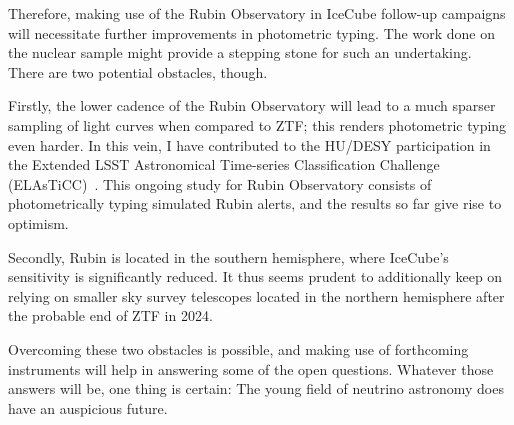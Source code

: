 Therefore, making use of the Rubin Observatory in IceCube follow-up campaigns will necessitate further improvements in photometric typing. The work done on the nuclear sample might provide a stepping stone for such an undertaking. There are two potential obstacles, though.

Firstly, the lower cadence of the Rubin Observatory will lead to a much sparser sampling of light curves when compared to ZTF; this renders photometric typing even harder. In this vein, I have contributed to the HU/DESY participation in the Extended LSST Astronomical Time-series Classification Challenge (ELAsTiCC)~. This ongoing study for Rubin Observatory consists of photometrically typing simulated Rubin alerts, and the results so far give rise to optimism.

Secondly, Rubin is located in the southern hemisphere, where IceCube's sensitivity is significantly reduced. It thus seems prudent to additionally keep on relying on smaller sky survey telescopes located in the northern hemisphere after the probable end of ZTF in 2024.

Overcoming these two obstacles is possible, and making use of forthcoming instruments will help in answering some of the open questions. Whatever those answers will be, one thing is certain: The young field of neutrino astronomy does have an auspicious future.